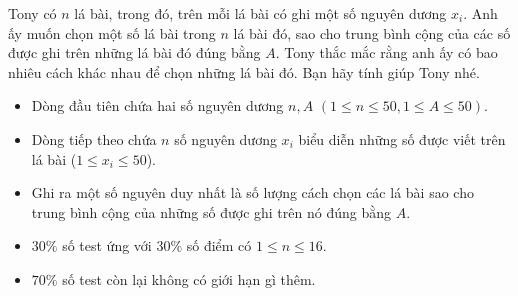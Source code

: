 \documentclass[12pt,a4paper,oneside]{article}
\begin{document}

\renewcommand{\baselinestretch}{1.25}
\setlength{\parskip}{0.5em}


Tony có $n$ lá bài, trong đó, trên mỗi lá bài có ghi một số nguyên dương $x_i$. Anh ấy muốn chọn một số lá bài trong $n$ lá bài đó, sao cho trung bình cộng của các số được ghi trên những lá bài đó đúng bằng $A$. Tony thắc mắc rằng anh ấy có bao nhiêu cách khác nhau để chọn những lá bài đó. Bạn hãy tính giúp Tony nhé. 

\renewcommand{\baselinestretch}{1.0}
\setlength{\parskip}{0.25em}


\begin{itemize}
    \item Dòng đầu tiên chứa hai số nguyên dương $n, A$ $(1 \le  n \le 50, 1 \le A \le 50)$.
    \item Dòng tiếp theo chứa $n$ số nguyên dương $x_i$ biểu diễn những số được viết trên lá bài ($1 \le x_i \le 50$).
\end{itemize}


\begin{itemize}
    \item Ghi ra một số nguyên duy nhất là số lượng cách chọn các lá bài sao cho trung bình cộng của những số được ghi trên nó đúng bằng $A$.
\end{itemize}


\begin{example}
        \end{example}
    

\begin{itemize}
    \item $30\%$ số test ứng với $30\%$ số điểm có $1 \le n \le 16$.
    \item $70\%$ số test còn lại không có giới hạn gì thêm.
\end{itemize}
\end{document}
